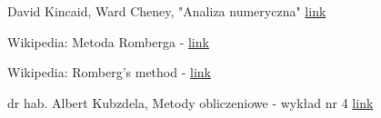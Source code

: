 \documentclass[a4paper,12pt]{article}
\begin{document}
\begin{thebibliography}{}

David Kincaid, Ward Cheney, "Analiza numeryczna" \href{https://www.impan.pl/~szczep/AMM1/Kincaid.pdf}{link}

Wikipedia: Metoda Romberga - \href{https://pl.wikipedia.org/wiki/Metoda_Romberga}{link}

Wikipedia: Romberg's method - \href{https://en.wikipedia.org/wiki/Romberg%27s_method}{link}

dr hab. Albert Kubzdela, Metody obliczeniowe - wykład nr 4 \href{http://albert.kubzdela.pracownik.put.poznan.pl/p4-10.pdf}{link}

\end{thebibliography}
\end{document}
